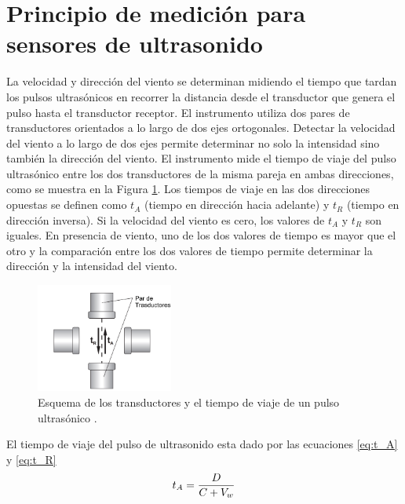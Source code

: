 \section{Principio de medición para sensores de ultrasonido}\label{ap:principioDeMedicionUltrasonido}

La velocidad y dirección del viento se determinan midiendo el tiempo que tardan los pulsos ultrasónicos en recorrer la distancia desde el transductor que genera el pulso hasta el transductor receptor. El instrumento utiliza dos pares de transductores orientados a lo largo de dos ejes ortogonales. Detectar la velocidad del viento a lo largo de dos ejes permite determinar no solo la intensidad sino también la dirección del viento. El instrumento mide el tiempo de viaje del pulso ultrasónico entre los dos transductores de la misma pareja en ambas direcciones, como se muestra en la Figura \ref{fig:trasductoresUltra}. Los tiempos de viaje en las dos direcciones opuestas se definen como $t_{A}$ (tiempo en dirección hacia adelante) y $t_{R}$ (tiempo en dirección inversa). Si la velocidad del viento es cero, los valores de $t_{A}$ y $t_{R}$ son iguales. En presencia de viento, uno de los dos valores de tiempo es mayor que el otro y la comparación entre los dos valores de tiempo permite determinar la dirección y la intensidad del viento.

\begin{figure}[H]
  \centering
  \includegraphics[width=0.4\textwidth]{Figuras/apendiceA/trasductoresUltra.png}
  \caption{Esquema de los transductores y el tiempo de viaje de un pulso ultrasónico \cite{DeltaOHM_HD51.3D_manual}.}
  \label{fig:trasductoresUltra}
\end{figure}

El tiempo de viaje del pulso de ultrasonido esta dado por las ecuaciones \ref{eq:t_A} y \ref{eq:t_R}
\begin{equation}
  t_{A} = \frac{D}{C + V_{w}}
  \centering
  \label{eq:t_A}
\end{equation}

